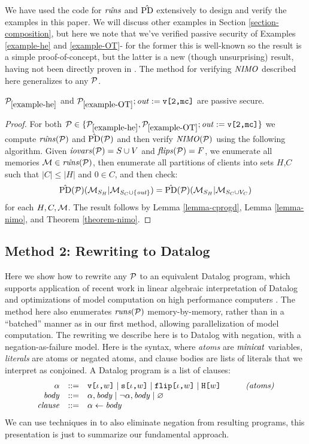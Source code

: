 We have used the code for $\hat{\mathit{runs}}$ and $\hat{\mathrm{PD}}$ extensively to design and
verify the examples in this paper. We will discuss other examples in
Section \ref{section-composition}, but here we note that we've verified
passive security of Examples \ref{example-he} and \ref{example-OT}-
for the former this is well-known so the result is a simple proof-of-concept,
but the latter is a new (though unsurprising) result, having not been
directly proven in \cite{XXX}. The method for
verifying $\mathit{NIMO}$ described here generalizes to any $\mathcal{P}$. 
\begin{lemma}
  $\mathcal{P}_{\ref{example-he}}$ and $\mathcal{P}_{\ref{example-OT}};\mathit{out} := \texttt{v[2,mc]}$ are
  passive secure.
\end{lemma}
\begin{proof}
  For both $\mathcal{P} \in \{
  \mathcal{P}_{\ref{example-he}},\mathcal{P}_{\ref{example-OT}};\mathit{out} := \texttt{v[2,mc]}\}$
  we compute $\hat{\mathit{runs}}(\mathcal{P})$ and $\hat{\mathrm{PD}}(\mathcal{P})$ and then verify
  $\mathit{NIMO}(\mathcal{P})$ using the following algorithm. Given $\mathit{iovars}(\mathcal{P}) = S
  \cup V$ and $\mathit{flips}(\mathcal{P}) = F$, we enumerate all memories $\mathcal{M}
  \in \hat{\mathit{runs}}(\mathcal{P})$, then enumerate all partitions of clients into
  sets $H$,$C$ such that $|C| \le |H|$ and $0 \in C$, and then check:
  $$
  \hat{\mathrm{PD}}(\mathcal{P})(\mathcal{M}_{S_H}|\mathcal{M}_{S_C \cup \{\mathit{out}\}}) =
  \hat{\mathrm{PD}}(\mathcal{P})(\mathcal{M}_{S_H}|\mathcal{M}_{S_C \cup V_C})
  $$
  for each $H,C,\mathcal{M}$. The result follows by Lemma \ref{lemma-cprogd}, Lemma \ref{lemma-nimo}, and
  Theorem \ref{theorem-nimo}.
\end{proof}

\subsection{Method 2: Rewriting to Datalog}
\label{section-bruteforce-datalog}

Here we show how to rewrite any $\mathcal{P}$ to an equivalent Datalog
program, which supports application of recent work in linear algebraic
interpretation of Datalog and optimizations of model computation on
high performance computers \cite{XXX}. The method here also enumerates
$\mathit{runs}(\mathcal{P})$ memory-by-memory, rather than in a ``batched'' manner
as in our first method, allowing parallelization of model
computation. The rewriting we describe here is to Datalog with
negation, with a negation-as-failure model. Here is the syntax,
where \emph{atoms} are $\mathit{minicat}$ variables, \emph{literals}
are atoms or negated atoms, and clause bodies are lists of
literals that we interpret as conjoined. A Datalog program
is a list of clauses:
$$
\begin{array}{rclr}
  \alpha &::=& \texttt{v[}\iota\texttt{,}w\texttt{]} \mid  \texttt{s[}\iota\texttt{,}w\texttt{]} \mid \texttt{flip[}\iota\texttt{,}w\texttt{]} \mid \texttt{H[}w\texttt{]} & \qquad \textit{(atoms)}\\
  \mathit{body} &::=&  \alpha,\mathit{body} \mid \neg\alpha,\mathit{body} \mid \varnothing \\
  \mathit{clause} &::=& \alpha \gets \mathit{body}
\end{array}
$$
We can use techniques in \cite{XXX} to also eliminate negation from
resulting programs, this presentation is just to summarize our
fundamental approach.


